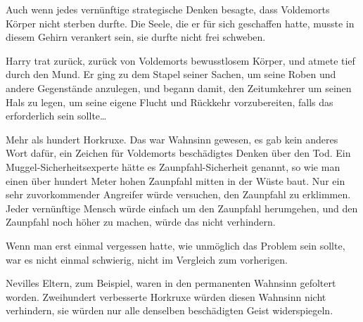 Auch wenn jedes vernünftige strategische Denken besagte, dass Voldemorts Körper nicht sterben durfte. Die Seele, die er für sich geschaffen hatte, musste in diesem Gehirn verankert sein, sie durfte nicht frei schweben.

Harry trat zurück, zurück von Voldemorts bewusstlosem Körper, und atmete tief durch den Mund. Er ging zu dem Stapel seiner Sachen, um seine Roben und andere Gegenstände anzulegen, und begann damit, den Zeitumkehrer um seinen Hals zu legen, um seine eigene Flucht und Rückkehr vorzubereiten, falls das erforderlich sein sollte…

Mehr als hundert Horkruxe.
Das war Wahnsinn gewesen, es gab kein anderes Wort dafür, ein Zeichen für Voldemorts beschädigtes Denken über den Tod. Ein Muggel-Sicherheitsexperte hätte es Zaunpfahl-Sicherheit genannt, so wie man einen über hundert Meter hohen Zaunpfahl mitten in der Wüste baut. Nur ein sehr zuvorkommender Angreifer würde versuchen, den Zaunpfahl zu erklimmen. Jeder vernünftige Mensch würde einfach um den Zaunpfahl herumgehen, und den Zaunpfahl noch höher zu machen, würde das nicht verhindern.

Wenn man erst einmal vergessen hatte, wie unmöglich das Problem sein sollte, war es nicht einmal schwierig, nicht im Vergleich zum vorherigen.

Nevilles Eltern, zum Beispiel, waren in den permanenten Wahnsinn gefoltert worden. Zweihundert verbesserte Horkruxe würden diesen Wahnsinn nicht verhindern, sie würden nur alle denselben beschädigten Geist widerspiegeln.

